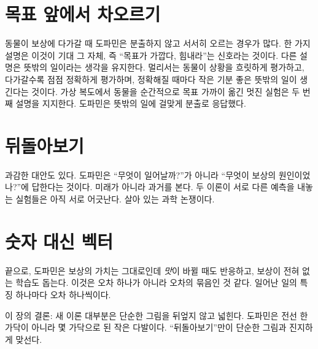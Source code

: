 \section*{목표 앞에서 차오르기}

동물이 보상에 다가갈 때 도파민은 분출하지 않고 서서히 오르는 경우가 많다. 한 가지 설명은 이것이 기대 그 자체, 즉 “목표가 가깝다, 힘내라”는 신호라는 것이다. 다른 설명은 뜻밖의 일이라는 생각을 유지한다. 멀리서는 동물이 상황을 흐릿하게 평가하고, 다가갈수록 점점 정확하게 평가하며, 정확해질 때마다 작은 기분 좋은 뜻밖의 일이 생긴다는 것이다. 가상 복도에서 동물을 순간적으로 목표 가까이 옮긴 멋진 실험은 두 번째 설명을 지지한다. 도파민은 뜻밖의 일에 걸맞게 분출로 응답했다.

\section*{뒤돌아보기}

과감한 대안도 있다. 도파민은 “무엇이 일어날까?”가 아니라 “무엇이 보상의 원인이었나?”에 답한다는 것이다. 미래가 아니라 과거를 본다. 두 이론이 서로 다른 예측을 내놓는 실험들은 아직 서로 어긋난다. 살아 있는 과학 논쟁이다.

\section*{숫자 대신 벡터}

끝으로, 도파민은 보상의 가치는 그대로인데 \emph{맛}이 바뀔 때도 반응하고, 보상이 전혀 없는 학습도 돕는다. 이것은 오차 하나가 아니라 오차의 묶음인 것 같다. 일어난 일의 특징 하나마다 오차 하나씩이다.

이 장의 결론: 새 이론 대부분은 단순한 그림을 뒤엎지 않고 넓힌다. 도파민은 전선 한 가닥이 아니라 몇 가닥으로 된 작은 다발이다. “뒤돌아보기”만이 단순한 그림과 진지하게 맞선다.

